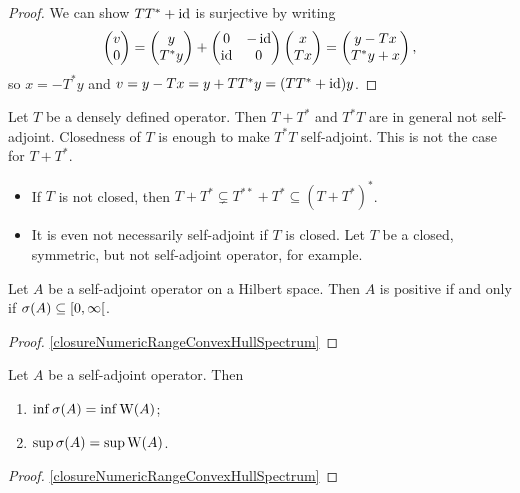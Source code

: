 \begin{proof}
We can show $TT^* + \operatorname{id}$ is surjective by writing
\[ \begin{pmatrix}
v \\ 0
\end{pmatrix} = \begin{pmatrix}
y \\ T^*y
\end{pmatrix} + \begin{pmatrix}
0 & -\operatorname{id} \\ \operatorname{id} & 0
\end{pmatrix}\begin{pmatrix}
x \\ Tx
\end{pmatrix} = \begin{pmatrix}
y - Tx \\ T^*y + x
\end{pmatrix}, \]
so $x = -T^*y$ and $v = y - Tx = y+TT^*y = (TT^* + \operatorname{id})y$.
\end{proof}

\begin{example}
Let $T$ be a densely defined operator. Then $T+T^*$ and $T^*T$ are in general not self-adjoint. Closedness of $T$ is enough to make $T^*T$ self-adjoint. This is not the case for $T+T^*$.
\begin{itemize}
\item If $T$ is not closed, then $T+T^* \subsetneq T^{**} + T^* \subseteq (T+T^*)^*$.
\item It is even not necessarily self-adjoint if $T$ is closed. Let $T$ be a closed, symmetric, but not self-adjoint operator, for example.
\end{itemize}
\end{example}

\begin{proposition}
Let $A$ be a self-adjoint operator on a Hilbert space. Then $A$ is positive \textup{if and only if} $\sigma(A)\subseteq [0,\infty[$.
\end{proposition}
\begin{proof}
\ref{closureNumericRangeConvexHullSpectrum}
\end{proof}

\begin{proposition}
Let $A$ be a self-adjoint operator. Then
\begin{enumerate}
\item $\inf \sigma(A) = \inf\operatorname{W}(A)$;
\item $\sup \sigma(A) = \sup\operatorname{W}(A)$.
\end{enumerate}
\end{proposition}
\begin{proof}
\ref{closureNumericRangeConvexHullSpectrum}
\end{proof}

